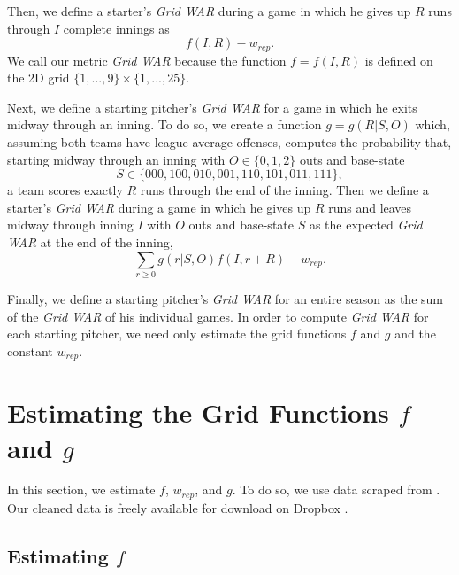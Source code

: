 \documentclass[12pt]{article}
\begin{document}
Then, we define a starter's \textit{Grid WAR} during a game in which he gives up $R$ runs through $I$ complete innings as 
\begin{equation}
f(I, R) - w_{rep}.
\label{eqn:war_f}
\end{equation}
We call our metric \textit{Grid WAR} because the function $f=f(I,R)$ is defined on the 2D grid $\{1,...,9\} \times \{1,...,25\}$.

Next, we define a starting pitcher's \textit{Grid WAR} for a game in which he exits midway through an inning. To do so, we create a function $g=g(R|S,O)$ which, assuming both teams have league-average offenses, computes the probability that, starting midway through an inning with $O \in \{0,1,2\}$ outs and base-state 
$$S \in \{000,100,010,001,110,101,011,111\},$$
a team scores exactly $R$ runs through the end of the inning. Then we define a starter's \textit{Grid WAR} during a game in which he gives up $R$ runs and leaves midway through inning $I$ with $O$ outs and base-state $S$ as the expected \textit{Grid WAR} at the end of the inning,
\begin{equation}
\sum_{r \geq 0} g(r|S,O) f(I,r+R) - w_{rep}.
\label{eqn:war_g}
\end{equation}

Finally, we define a starting pitcher's \textit{Grid WAR} for an entire season as the sum of the \textit{Grid WAR} of his individual games. In order to compute \textit{Grid WAR} for each starting pitcher, we need only estimate the grid functions $f$ and $g$ and the constant $w_{rep}$.

\section{Estimating the Grid Functions $f$ and $g$}

In this section, we estimate $f$, $w_{rep}$, and $g$. To do so, we use data scraped from \citet{retroRaw}. Our cleaned data is freely available for download on Dropbox \citep{dropboxRetrosheet}. 

\subsection{Estimating $f$}
\end{document}
